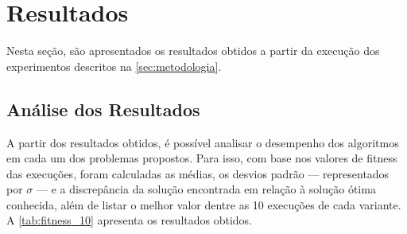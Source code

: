 \section{Resultados}%
\label{sec:resultados}

Nesta seção, são apresentados os resultados obtidos a partir da execução dos experimentos descritos na \autoref{sec:metodologia}.

\subsection{Análise dos Resultados}%

A partir dos resultados obtidos, é possível analisar o desempenho dos algoritmos em cada um dos problemas propostos.
Para isso, com base nos valores de \gls{fitness} das execuções, foram calculadas as médias, os desvios padrão --- representados por \( \sigma \) --- e a discrepância da solução encontrada em relação à solução ótima conhecida, além de listar o melhor valor dentre as 10 execuções de cada variante.
A \autoref{tab:fitness_10} apresenta os resultados obtidos.


